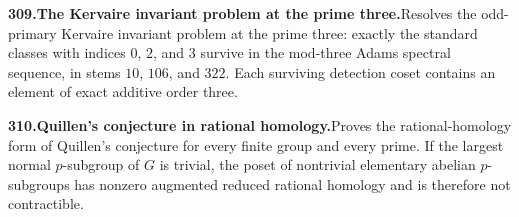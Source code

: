 \documentclass[11pt,a4paper]{article}
\begin{document}
  \par \begin{minipage}{\linewidth}
  \fontsize{10.5}{12.6}\selectfont\RaggedRight
  \hypertarget{result 309}{}
  {\bfseries\textcolor{muted}{309.}\enspace The Kervaire invariant problem at the prime three.}\enspace Resolves the odd-primary Kervaire invariant problem at the prime three: exactly the standard classes with indices $0$, $2$, and $3$ survive in the mod-three Adams spectral sequence, in stems $10$, $106$, and $322$. Each surviving detection coset contains an element of exact additive order three.\par
  \end{minipage}\par\vspace{5pt}



  \par \begin{minipage}{\linewidth}
  \fontsize{10.5}{12.6}\selectfont\RaggedRight
  \hypertarget{result 310}{}
  {\bfseries\textcolor{muted}{310.}\enspace Quillen's conjecture in rational homology.}\enspace Proves the rational-homology form of Quillen's conjecture for every finite group and every prime. If the largest normal $p$-subgroup of $G$ is trivial, the poset of nontrivial elementary abelian $p$-subgroups has nonzero augmented reduced rational homology and is therefore not contractible.\par
  \end{minipage}\par\vspace{5pt}
\end{document}
